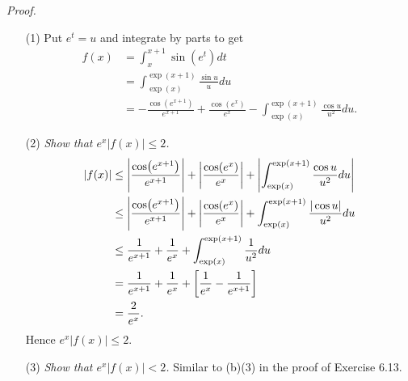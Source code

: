 \documentclass{article}
\begin{document}
\emph{Proof.}
\begin{enumerate}
  \item[(1)]
  Put $e^t = u$ and integrate by parts to get
  \begin{align*}
    f(x)
    &= \int_{x}^{x+1} \sin(e^t)dt \\
    &= \int_{\exp(x)}^{\exp(x+1)} \frac{\sin u}{u} du \\
    &= - \frac{\cos(e^{x+1})}{e^{x+1}}
      + \frac{\cos(e^x)}{e^x}
      - \int_{\exp(x)}^{\exp(x+1)} \frac{\cos u}{u^2} du.
  \end{align*}

  \item[(2)]
  \emph{Show that $e^x|f(x)| \leq 2$.}
  \begin{align*}
    |f(x)|
    &\leq \abs{ \frac{\cos(e^{x+1})}{e^{x+1}} }
      + \abs{ \frac{\cos(e^x)}{e^x} }
      + \abs{ \int_{\exp(x)}^{\exp(x+1)} \frac{\cos u}{u^2} du } \\
    &\leq \abs{ \frac{\cos(e^{x+1})}{e^{x+1}} }
      + \abs{ \frac{\cos(e^x)}{e^x} }
      + \int_{\exp(x)}^{\exp(x+1)} \frac{|\cos u|}{u^2} du \\
    &\leq \frac{1}{e^{x+1}}
      + \frac{1}{e^x}
      + \int_{\exp(x)}^{\exp(x+1)} \frac{1}{u^2} du \\
    &= \frac{1}{e^{x+1}}
      + \frac{1}{e^x}
      + \left[ \frac{1}{e^x} - \frac{1}{e^{x+1}} \right] \\
    &= \frac{2}{e^x}.
  \end{align*}
  Hence $e^x|f(x)| \leq 2$.

  \item[(3)]
  \emph{Show that $e^x|f(x)| < 2$.}
  Similar to (b)(3) in the proof of Exercise 6.13.


\end{enumerate}
\end{document}
